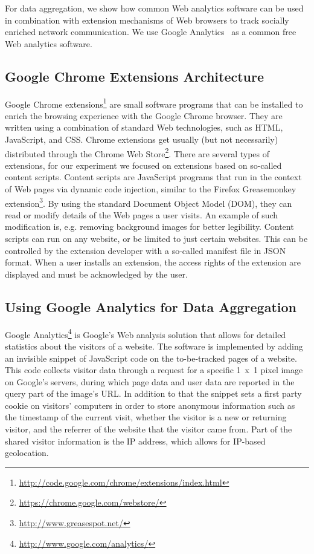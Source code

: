 \documentclass[12pt]{article}
\begin{document}
For data aggregation, we show how common Web analytics software can be used in combination with extension mechanisms of Web browsers to track socially enriched network communication. We use Google Analytics~\cite{analytics} as a common free Web analytics software. 

\subsection{Google Chrome Extensions Architecture}
Google Chrome extensions\footnote{\url{http://code.google.com/chrome/extensions/index.html}} are small software programs that can be installed to enrich the browsing experience with the Google Chrome browser. They are written using a combination of standard Web technologies, such as HTML, JavaScript, and CSS. Chrome extensions get usually (but not necessarily) distributed through the Chrome Web Store\footnote{\url{https://chrome.google.com/webstore/}}. There are several types of extensions, for our experiment we focused on extensions based on so-called content scripts. Content scripts are JavaScript programs that run in the context of Web pages via dynamic code injection, similar to the Firefox Greasemonkey extension\footnote{\url{http://www.greasespot.net/}}. By using the standard Document Object Model (DOM), they can read or modify details of the Web pages a user visits. An example of such modification is, e.g. removing background images for better legibility. Content scripts can run on any website, or be limited to just certain websites. This can be controlled by the extension developer with a so-called manifest file in JSON format. When a user installs an extension, the access rights of the extension are displayed and must be acknowledged by the user.

\subsection{Using Google Analytics for Data Aggregation}\label{sec:analytics}
Google Analytics\footnote{\url{http://www.google.com/analytics/}} is Google's Web analysis solution that allows for detailed statistics about the visitors of a website. The software is implemented by adding an invisible snippet of JavaScript code on the to-be-tracked pages of a website. This code collects visitor data through a request for a specific 1~x~1 pixel image on Google's servers, during which page data and user data are reported in the query part of the image's URL. In addition to that the snippet sets a first party cookie on visitors' computers in order to store anonymous information such as the timestamp of the current visit, whether the visitor is a new or returning visitor, and the referrer of the website that the visitor came from. Part of the shared visitor information is the IP address, which allows for IP-based geolocation.
\end{document}
